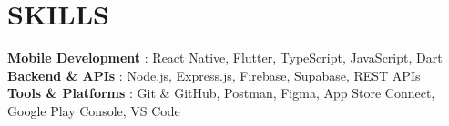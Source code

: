 \documentclass[letterpaper,11pt]{article}
\begin{document}
%
\section{SKILLS}
 \begin{itemize}[leftmargin=0in, label={}]
    \small{\item{
     \textbf{Mobile Development} {: React Native, Flutter, TypeScript, JavaScript, Dart}\vspace{2pt} \\
     \textbf{Backend \& APIs}    {: Node.js, Express.js, Firebase, Supabase, REST APIs}\vspace{2pt} \\
     \textbf{Tools \& Platforms} {: Git \& GitHub, Postman, Figma, App Store Connect, Google Play Console, VS Code}
    }}
 \end{itemize}


\end{document}
